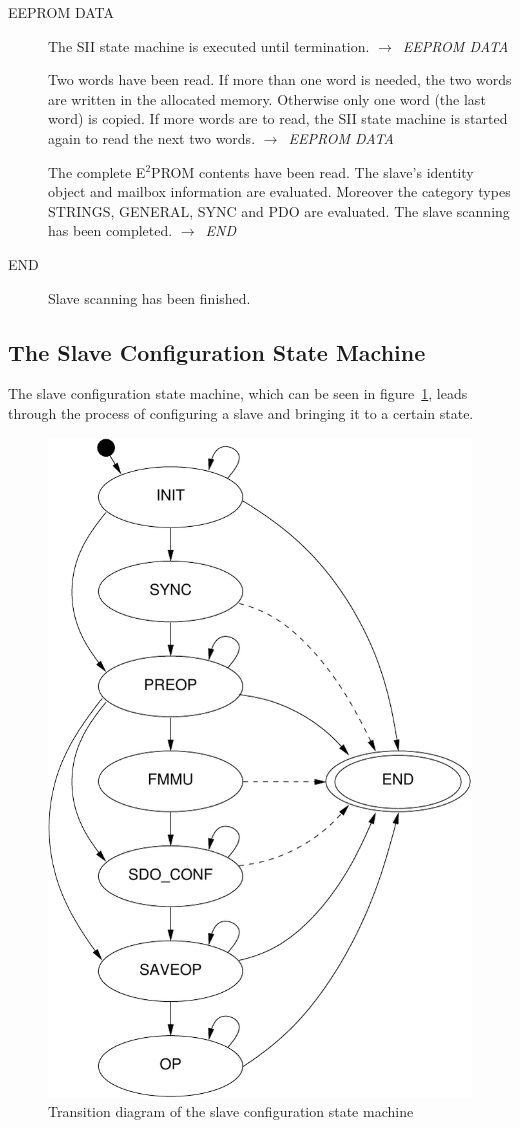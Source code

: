 \documentclass[a4paper,12pt,BCOR6mm,bibtotoc,idxtotoc]{scrbook}
\begin{document}
\begin{description}
\item[EEPROM DATA] The SII state machine is executed until
  termination. $\rightarrow$~\textit{EEPROM DATA}

  Two words have been read. If more than one word is needed, the two
  words are written in the allocated memory. Otherwise only one word
  (the last word) is copied. If more words are to read, the SII state
  machine is started again to read the next two words.
  $\rightarrow$~\textit{EEPROM DATA}

  The complete E$^2$PROM contents have been read. The slave's identity
  object and mailbox information are evaluated. Moreover the category
  types STRINGS, GENERAL, SYNC and PDO are evaluated. The slave
  scanning has been completed. $\rightarrow$~\textit{END}

\item[END] Slave scanning has been finished.

\end{description}


\subsection{The Slave Configuration State Machine}
\label{sec:fsm-conf}

The slave configuration state machine, which can be seen in
figure~\ref{fig:fsm-slaveconf}, leads through the process of
configuring a slave and bringing it to a certain state.

\begin{figure}[htbp]
  \centering
  \includegraphics[width=.6\textwidth]{images/fsm-slaveconf}
  \caption{Transition diagram of the slave configuration state
    machine}
  \label{fig:fsm-slaveconf}
\end{figure}
\end{document}
